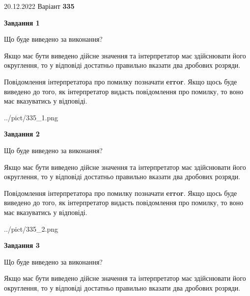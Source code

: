 \documentclass[12pt, ukrainian]{article}
\begin{document}
{20.12.2022 Варіант \No \textbf { 335 }\par}
{
\begin {Large}

{\begin {center}\textbf{Завдання 1}\end {center}}\par
Що буде виведено за виконання? \par

Якщо має бути виведено дійсне значення та інтерпретатор має здійснювати його округлення, 
то у відповіді достатньо правильно вказати два дробових розряди.

Повідомлення інтерпретатора про помилку позначати \textbf{error}.
Якщо щось буде виведено до того, як інтерпретатор видасть повідомлення про помилку, 
то воно має вказуватись у відповіді. \par

\begin{center}
	{../pict/335_1.png}
\end{center}
\newpage

{\begin {center}\textbf{Завдання 2}\end {center}}\par
Що буде виведено за виконання? \par

Якщо має бути виведено дійсне значення та інтерпретатор має здійснювати його округлення, 
то у відповіді достатньо правильно вказати два дробових розряди.

Повідомлення інтерпретатора про помилку позначати \textbf{error}.
Якщо щось буде виведено до того, як інтерпретатор видасть повідомлення про помилку, 
то воно має вказуватись у відповіді. \par

\begin{center}
	{../pict/335_2.png}
\end{center}
\newpage

{\begin {center}\textbf{Завдання 3}\end {center}}\par
Що буде виведено за виконання? \par

Якщо має бути виведено дійсне значення та інтерпретатор має здійснювати його округлення, 
то у відповіді достатньо правильно вказати два дробових розряди.


\end{Large}}
\end{document}
